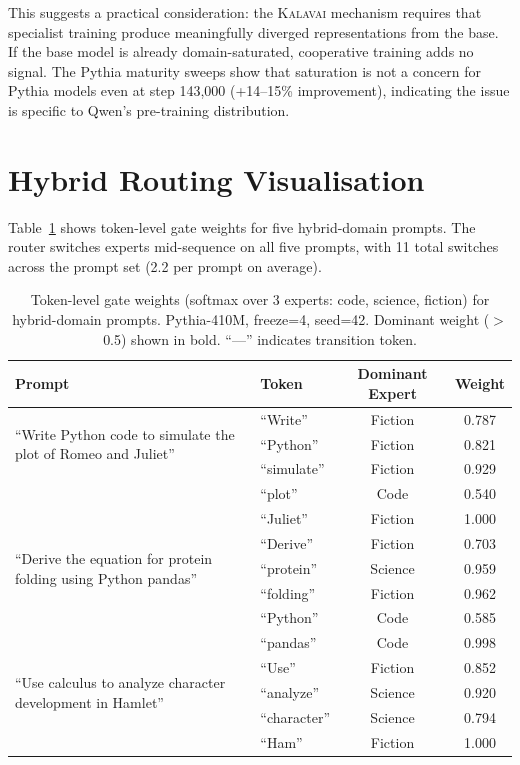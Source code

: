 \documentclass{article}
\newcommand{\kalavai}{\textsc{Kalavai}\xspace}
\begin{document}
This suggests a practical consideration: the \kalavai mechanism requires that specialist training produce meaningfully diverged representations from the base. If the base model is already domain-saturated, cooperative training adds no signal. The Pythia maturity sweeps show that saturation is not a concern for Pythia models even at step 143,000 (+14--15\% improvement), indicating the issue is specific to Qwen's pre-training distribution.

\section{Hybrid Routing Visualisation}
\label{app:routing}

Table~\ref{tab:routing} shows token-level gate weights for five hybrid-domain prompts. The router switches experts mid-sequence on all five prompts, with 11 total switches across the prompt set (2.2 per prompt on average).

\begin{table}[h]
\centering
\caption{Token-level gate weights (softmax over 3 experts: code, science, fiction) for hybrid-domain prompts. Pythia-410M, freeze=4, seed=42. Dominant weight ($>$0.5) shown in bold. ``---'' indicates transition token.}
\label{tab:routing}
\small
\begin{tabular}{p{3.5cm}lcc}
\toprule
\textbf{Prompt} & \textbf{Token} & \textbf{Dominant Expert} & \textbf{Weight} \\
\midrule
\multirow{3}{*}{\parbox{3.5cm}{``Write Python code to simulate the plot of Romeo and Juliet''}}
  & ``Write''    & Fiction & 0.787 \\
  & ``Python''   & Fiction & 0.821 \\
  & ``simulate'' & Fiction & 0.929 \\
  & ``plot''     & Code    & 0.540 \\
  & ``Juliet''   & Fiction & 1.000 \\
\midrule
\multirow{3}{*}{\parbox{3.5cm}{``Derive the equation for protein folding using Python pandas''}}
  & ``Derive''   & Fiction & 0.703 \\
  & ``protein''  & Science & 0.959 \\
  & ``folding''  & Fiction & 0.962 \\
  & ``Python''   & Code    & 0.585 \\
  & ``pandas''   & Code    & 0.998 \\
\midrule
\multirow{3}{*}{\parbox{3.5cm}{``Use calculus to analyze character development in Hamlet''}}
  & ``Use''      & Fiction & 0.852 \\
  & ``analyze''  & Science & 0.920 \\
  & ``character'' & Science & 0.794 \\
  & ``Ham''      & Fiction & 1.000 \\
\bottomrule
\end{tabular}
\end{table}
\end{document}
